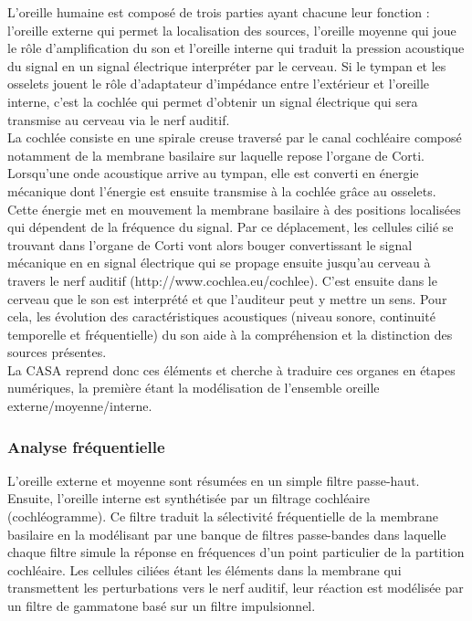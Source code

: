 L'oreille humaine est composé de trois parties ayant chacune leur fonction : l'oreille externe  qui permet la localisation des sources, l'oreille moyenne qui joue le rôle d'amplification du son et l'oreille interne qui traduit la pression acoustique du signal en un signal électrique interpréter par le cerveau. Si le tympan et les osselets jouent le rôle d'adaptateur d'impédance entre l'extérieur et l'oreille interne, c'est la cochlée qui permet d'obtenir un signal électrique qui sera transmise au cerveau via le nerf auditif. \\


La cochlée consiste en une spirale creuse traversé par le canal cochléaire composé notamment de la membrane basilaire sur laquelle repose l'organe de Corti. Lorsqu'une onde acoustique arrive au tympan, elle est converti en énergie mécanique dont l'énergie est ensuite transmise à la cochlée grâce au osselets. Cette énergie met en mouvement la membrane basilaire à des positions localisées qui dépendent de la fréquence du signal. Par ce déplacement, les cellules cilié se trouvant dans l'organe de Corti vont alors bouger convertissant le signal mécanique en en signal électrique qui se propage ensuite jusqu'au cerveau à travers le nerf auditif (http://www.cochlea.eu/cochlee). C'est ensuite dans le cerveau que le son est interprété et que l'auditeur peut y mettre un sens. Pour cela, les évolution des caractéristiques acoustiques (niveau sonore, continuité temporelle et fréquentielle) du son aide à la compréhension et la distinction des sources présentes. \\

La CASA reprend donc ces éléments et cherche à traduire ces organes en étapes numériques, la première étant la modélisation de l'ensemble oreille externe/moyenne/interne.\\

\subsubsection{Analyse fréquentielle}

L'oreille externe et moyenne sont résumées en un simple filtre passe-haut. Ensuite, l'oreille interne est synthétisée par un filtrage cochléaire (cochléogramme). Ce filtre traduit la sélectivité fréquentielle de la membrane basilaire en la modélisant par une banque de filtres passe-bandes dans laquelle chaque filtre simule la réponse en fréquences d'un point particulier de la partition cochléaire. Les cellules ciliées étant les éléments dans la membrane qui transmettent les perturbations vers le nerf auditif, leur réaction est modélisée par un filtre de gammatone basé sur un filtre impulsionnel.\\

